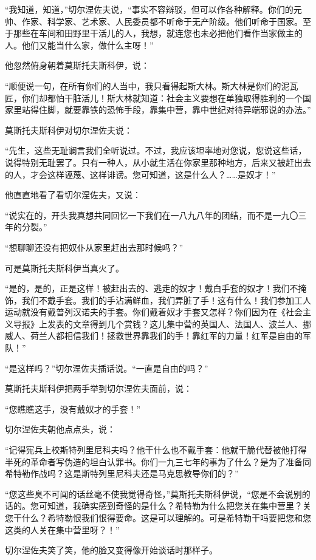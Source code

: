 “我知道，知道，”切尔涅佐夫说，“事实不容辩驳，但可以作各种解释。你们的元帅、作家、科学家、艺术家、人民委员都不听命于无产阶级。他们听命于国家。至于那些在车间和田野里干活儿的人，我想，就连您也未必把他们看作当家做主的人。他们又能当什么家，做什么主呀！”

他忽然俯身朝着莫斯托夫斯科伊，说：

“顺便说一句，在所有你们的人当中，我只看得起斯大林。斯大林是你们的泥瓦匠，你们却都怕干脏活儿！斯大林就知道：社会主义要想在单独取得胜利的一个国家里站得住脚，就要靠铁的恐怖手段，靠集中营，靠中世纪对待异端邪说的办法。”

莫斯托夫斯科伊对切尔涅佐夫说：

“先生，这些无耻谰言我们全听说过。不过，我应该坦率地对您说，您说这些话，说得特别无耻罢了。只有一种人，从小就生活在你家里那种地方，后来又被赶出去的人，才会这样诬蔑、这样诽谤。您可知道，这是什么人？……是奴才！”

他直直地看了看切尔涅佐夫，又说：

“说实在的，开头我真想共同回忆一下我们在一八九八年的团结，而不是一九〇三年的分裂。”

“想聊聊还没有把奴仆从家里赶出去那时候吗？”

可是莫斯托夫斯科伊当真火了。

“是的，是的，正是这样！被赶出去的、逃走的奴才！戴白手套的奴才！我们不掩饰，我们不戴手套。我们的手沾满鲜血，我们弄脏了手！这有什么！我们参加工人运动就没有戴普列汉诺夫的手套。你们戴着奴才手套又怎样？你们因为在《社会主义导报》上发表的文章得到几个赏钱？这儿集中营的英国人、法国人、波兰人、挪威人、荷兰人都相信我们！拯救世界靠我们的手！靠红军的力量！红军是自由的军队！”

“是这样吗？”切尔涅佐夫插话说。“一直是自由的吗？”

莫斯托夫斯科伊把两手举到切尔涅佐夫面前，说：

“您瞧瞧这手，没有戴奴才的手套！”

切尔涅佐夫朝他点点头，说：

“记得宪兵上校斯特列里尼科夫吗？他干什么也不戴手套：他就干脆代替被他打得半死的革命者写伪造的坦白认罪书。你们一九三七年的事为了什么？是为了准备同希特勒作战吗？这是斯特列里尼科夫还是马克思教导你们的？”

“您这些臭不可闻的话丝毫不使我觉得奇怪，”莫斯托夫斯科伊说，“您是不会说别的话的。您可知道，我确实感到奇怪的是什么？希特勒为什么把您关在集中营里？关您干什么？希特勒恨我们恨得要命。这是可以理解的。可是希特勒干吗要把您和您这类的人关在集中营里呀？！”

切尔涅佐夫笑了笑，他的脸又变得像开始谈话时那样子。

